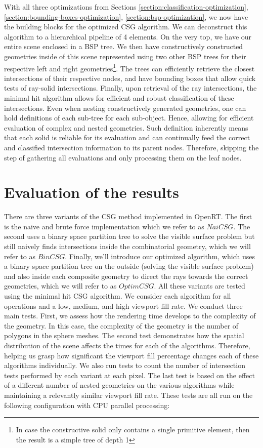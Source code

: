 \documentclass[a4paper,11pt,oneside]{article}
\begin{document}
With all three optimizations from Sections \ref{section:classification-optimization}, \ref{section:bounding-boxes-optimization}, \ref{section:bsp-optimization}, we now have the building blocks for the optimized CSG algorithm. We can deconstruct this algorithm to a hierarchical pipeline of 4 elements. On the very top, we have our entire scene enclosed in a BSP tree. We then have constructively constructed geometries inside of this scene represented using two other BSP trees for their respective left and right geometries\footnote{In case the constructive solid only contains a single primitive element, then the result is a simple tree of depth 1}. The trees can efficiently retrieve the closest intersections of their respective nodes, and have bounding boxes that allow quick tests of ray-solid intersections. Finally, upon retrieval of the ray intersections, the minimal hit algorithm allows for efficient and robust classification of these intersections. Even when nesting constructively generated geometries, one can hold definitions of each sub-tree for each sub-object. Hence, allowing for efficient evaluation of complex and nested geometries.  Such definition inherently means that each solid is reliable for its evaluation and can continually feed the correct and classified intersection information to its parent nodes. Therefore, skipping the step of gathering all evaluations and only processing them on the leaf nodes.

\section{Evaluation of the results}

There are three variants of the CSG method implemented in OpenRT. The first is the naive and brute force implementation which we refer to as $NaiCSG$. The second uses a binary space partition tree to solve the visible surface problem but still naively finds intersections inside the combinatorial geometry, which we will refer to as $BinCSG$. Finally, we'll introduce our optimized algorithm, which uses a binary space partition tree on the outside (solving the visible surface problem) and also inside each composite geometry to direct the rays towards the correct geometries, which we will refer to as $OptimCSG$. All these variants are tested using the minimal hit CSG algorithm. We consider each algorithm for all operations and a low, medium, and high viewport fill rate. We conduct three main tests. First, we assess how the rendering time develops to the complexity of the geometry. In this case, the complexity of the geometry is the number of polygons in the sphere meshes. The second test demonstrates how the spatial distribution of the scene affects the times for each of the algorithms. Therefore, helping us grasp how significant the viewport fill percentage changes each of these algorithms individually. We also run tests to count the number of intersection tests performed by each variant at each pixel. The last test is based on the effect of a different number of nested geometries on the various algorithms while maintaining a relevantly similar viewport fill rate. These tests are all run on the following configuration with CPU parallel processing:
\end{document}
